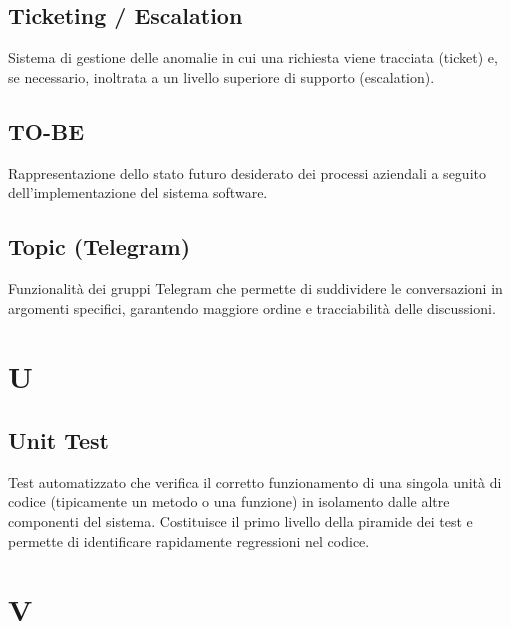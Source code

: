 \documentclass[a4paper, 11pt, oneside]{scrartcl} %
\begin{document}
\subsection*{Ticketing / Escalation}
Sistema di gestione delle anomalie in cui una richiesta viene tracciata (ticket) e, se necessario, inoltrata a un livello superiore di supporto (escalation).
\vspace{0.5cm}

\subsection*{TO-BE}
Rappresentazione dello stato futuro desiderato dei processi aziendali a seguito dell'implementazione del sistema software.
\vspace{0.5cm}

\subsection*{Topic (Telegram)}


Funzionalità dei gruppi Telegram che permette di suddividere le conversazioni in argomenti specifici, garantendo maggiore ordine e tracciabilità delle discussioni.

\vspace{0.5cm}


\section*{U}


\subsection*{Unit Test}
Test automatizzato che verifica il corretto funzionamento di una singola unità di codice (tipicamente un metodo o una funzione) in isolamento dalle altre componenti del sistema. Costituisce il primo livello della piramide dei test e permette di identificare rapidamente regressioni nel codice.
\vspace{0.5cm}


\section*{V}
\end{document}

